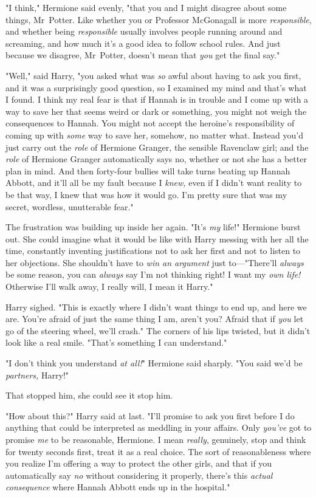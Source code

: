 "I think," Hermione said evenly, "that you and I might disagree about some
things, Mr~Potter. Like whether you or Professor McGonagall is more
\emph{responsible}, and whether being \emph{responsible} usually involves
people running around and screaming, and how much it's a good idea to follow
school rules. And just because we disagree, Mr~Potter, doesn't mean that
\emph{you} get the final say."

"Well," said Harry, "you asked what was \emph{so} awful about having to ask you
first, and it was a surprisingly good question, so I examined my mind and
that's what I found. I think my real fear is that if Hannah is in trouble and I
come up with a way to save her that seems weird or dark or something, you might
not weigh the consequences to Hannah. You might not accept the heroine's
responsibility of coming up with \emph{some} way to save her, somehow, no
matter what. Instead you'd just carry out the \emph{role} of Hermione Granger,
the sensible Ravenclaw girl; and the \emph{role} of Hermione Granger
automatically says no, whether or not she has a better plan in mind. And then
forty-four bullies will take turns beating up Hannah Abbott, and it'll all be
my fault because I \emph{knew,} even if I didn't want reality to be that way, I
knew that was how it would go. I'm pretty sure that was my secret, wordless,
unutterable fear."

The frustration was building up inside her again. "It's \emph{my} life!"
Hermione burst out. She could imagine what it would be like with Harry messing
with her all the time, constantly inventing justifications not to ask her first
and not to listen to her objections. She shouldn't have to \emph{win an
argument} just to—"There'll \emph{always} be some reason, you can
\emph{always} say I'm not thinking right! I want my \emph{own life!} Otherwise
I'll walk away, I really will, I mean it Harry."

Harry sighed. "This is exactly where I didn't want things to end up, and here
we are. You're afraid of just the same thing I am, aren't you? Afraid that if
\emph{you} let go of the steering wheel, we'll crash." The corners of his lips
twisted, but it didn't look like a real smile. "That's something I can
understand."

"I don't think you understand \emph{at all!}" Hermione said sharply. "You said
we'd be \emph{partners,} Harry!"

That stopped him, she could see it stop him.

"How about this?" Harry said at last. "I'll promise to ask you first before I
do anything that could be interpreted as meddling in your affairs. Only
\emph{you've} got to promise \emph{me} to be reasonable, Hermione. I mean
\emph{really}, genuinely, stop and think for twenty seconds first, treat it as
a real choice. The sort of reasonableness where you realize I'm offering a way
to protect the other girls, and that if you automatically say \emph{no} without
considering it properly, there's this \emph{actual consequence} where Hannah
Abbott ends up in the hospital."

